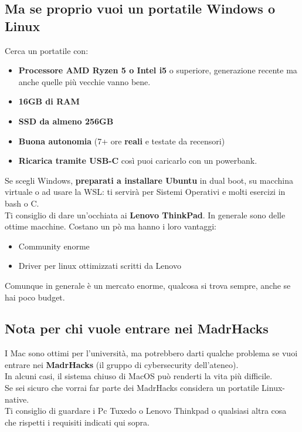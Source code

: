 \documentclass[18pt]{extarticle}
\begin{document}
\subsection{Ma se proprio vuoi un portatile Windows o Linux}
Cerca un portatile con:
\begin{itemize}
\item \textbf{Processore AMD Ryzen 5 o Intel i5} o superiore, generazione recente ma anche quelle più vecchie vanno bene.
\item \textbf{16GB di RAM}
\item \textbf{SSD da almeno 256GB}
\item \textbf{Buona autonomia} (7+ ore \textbf{reali} e testate da recensori)
\item \textbf{Ricarica tramite USB-C} così puoi caricarlo con un powerbank.
\end{itemize}%
Se scegli Windows, \textbf{preparati a installare Ubuntu} in dual boot, su macchina virtuale o ad usare la WSL: ti servirà per Sistemi Operativi e molti esercizi in bash o C.\\
Ti consiglio di dare un'occhiata ai \textbf{Lenovo ThinkPad}. In generale sono delle ottime macchine. Costano un pò ma hanno i loro vantaggi:
\begin{itemize}
\item Community enorme
\item Driver per linux ottimizzati scritti da Lenovo
\end{itemize}%
Comunque in generale è un mercato enorme, qualcosa si trova sempre, anche se hai poco budget.


\subsection{Nota per chi vuole entrare nei MadrHacks}
I Mac sono ottimi per l’università, ma potrebbero darti qualche problema se vuoi entrare nei \textbf{MadrHacks} (il gruppo di cybersecurity dell’ateneo).\\
In alcuni casi, il sistema chiuso di MacOS può renderti la vita più difficile.\\
Se sei sicuro che vorrai far parte dei MadrHacks considera un portatile Linux-native.\\
Ti consiglio di guardare i Pc Tuxedo o Lenovo Thinkpad o qualsiasi altra cosa che rispetti i requisiti indicati qui sopra.
\end{document}
